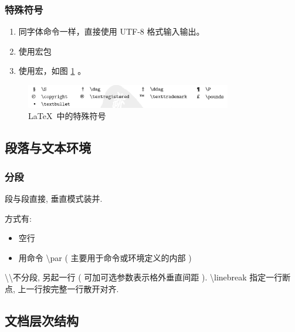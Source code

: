 \documentclass[UTF8]{ctexart}
\begin{document}
        \subsubsection{特殊符号}

            \begin{enumerate}
                \item 同字体命令一样，直接使用 UTF-8 格式输入输出。
                \item 使用宏包
                \item 使用宏，如图 \ref{fig:teshufuhao} 。
            \end{enumerate}

            \begin{figure}[ht]
                \centering
                \includegraphics[width=9cm]{figures/teshufuhao.PNG}
                \caption{\LaTeX\ 中的特殊符号}
                \label{fig:teshufuhao}
            \end{figure}

    \subsection{段落与文本环境}

            \subsubsection{分段}

                段与段直接, 垂直模式装并. 

                方式有: 
                \begin{itemize}
                    \item 空行
                    \item 用命令 \textbackslash par ( 主要用于命令或环境定义的内部 )
                \end{itemize}

                \textbackslash\textbackslash 不分段, 另起一行 ( 可加可选参数表示格外垂直间距 ). \textbackslash linebreak 指定一行断点, 上一行按完整一行散开对齐. 

    \subsection{文档层次结构}
\end{document}
